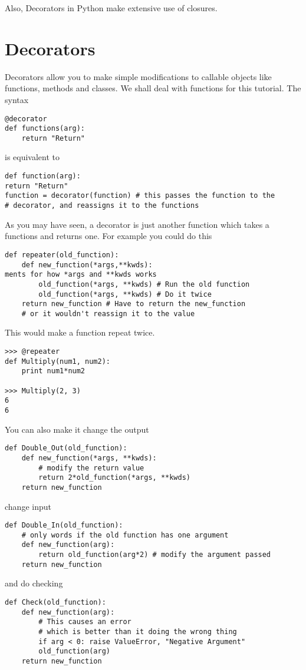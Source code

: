 \documentclass[a4paper,oneside]{book}
\numberwithin{equation}{chapter}
\begin{document}
Also, Decorators in Python make extensive use of closures.
\section{Decorators}
Decorators allow you to make simple modifications to callable objects like functions, methods and classes. We shall deal with functions for this tutorial. The syntax
\begin{verbatim}
@decorator
def functions(arg):
    return "Return"
\end{verbatim}
is equivalent to
\begin{verbatim}
def function(arg):
return "Return"
function = decorator(function) # this passes the function to the 
# decorator, and reassigns it to the functions
\end{verbatim}

As you may have seen, a decorator is just another function which takes a functions and returns one. For example you could do this
\begin{verbatim}
def repeater(old_function):
    def new_function(*args,**kwds):
ments for how *args and **kwds works
        old_function(*args, **kwds) # Run the old function
        old_function(*args, **kwds) # Do it twice
    return new_function # Have to return the new_function
    # or it wouldn't reassign it to the value
\end{verbatim}

This would make a function repeat twice.
\begin{verbatim}
>>> @repeater
def Multiply(num1, num2):
    print num1*num2

>>> Multiply(2, 3)
6
6
\end{verbatim}

You can also make it change the output
\begin{verbatim}
def Double_Out(old_function):
    def new_function(*args, **kwds):
        # modify the return value
        return 2*old_function(*args, **kwds) 
    return new_function
\end{verbatim}
change input
\begin{verbatim}
def Double_In(old_function):
    # only words if the old function has one argument
    def new_function(arg): 
        return old_function(arg*2) # modify the argument passed
    return new_function    
\end{verbatim}
and do checking 
\begin{verbatim}
def Check(old_function):
    def new_function(arg):
        # This causes an error
        # which is better than it doing the wrong thing
        if arg < 0: raise ValueError, "Negative Argument"
        old_function(arg)
    return new_function        
\end{verbatim}
\end{document}
